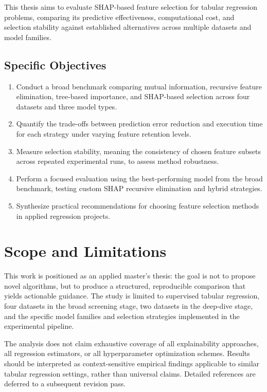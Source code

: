 This thesis aims to evaluate SHAP-based feature selection for tabular regression problems, comparing its predictive effectiveness, computational cost, and selection stability against established alternatives across multiple datasets and model families.

\subsection{Specific Objectives}

\begin{enumerate}
    \item Conduct a broad benchmark comparing mutual information, recursive feature elimination, tree-based importance, and SHAP-based selection across four datasets and three model types.
    \item Quantify the trade-offs between prediction error reduction and execution time for each strategy under varying feature retention levels.
    \item Measure selection stability, meaning the consistency of chosen feature subsets across repeated experimental runs, to assess method robustness.
    \item Perform a focused evaluation using the best-performing model from the broad benchmark, testing custom SHAP recursive elimination and hybrid strategies.
    \item Synthesize practical recommendations for choosing feature selection methods in applied regression projects.
\end{enumerate}

\section{Scope and Limitations}

This work is positioned as an applied master's thesis: the goal is not to propose novel algorithms, but to produce a structured, reproducible comparison that yields actionable guidance. The study is limited to supervised tabular regression, four datasets in the broad screening stage, two datasets in the deep-dive stage, and the specific model families and selection strategies implemented in the experimental pipeline.

The analysis does not claim exhaustive coverage of all explainability approaches, all regression estimators, or all hyperparameter optimization schemes. Results should be interpreted as context-sensitive empirical findings applicable to similar tabular regression settings, rather than universal claims. Detailed references are deferred to a subsequent revision pass.

